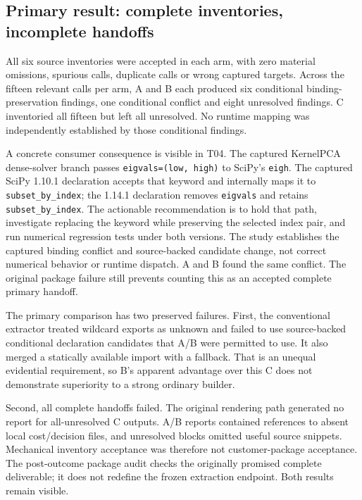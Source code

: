 \documentclass[11pt,a4paper]{article}
\begin{document}
\subsection{Primary result: complete inventories, incomplete handoffs}
All six source inventories were accepted in each arm, with zero material omissions, spurious calls, duplicate calls or wrong captured targets. Across the fifteen relevant calls per arm, A and B each produced six conditional binding-preservation findings, one conditional conflict and eight unresolved findings. C inventoried all fifteen but left all unresolved. No runtime mapping was independently established by those conditional findings.

A concrete consumer consequence is visible in T04. The captured KernelPCA dense-solver branch passes \texttt{eigvals=(low, high)} to SciPy's \texttt{eigh}. The captured SciPy 1.10.1 declaration accepts that keyword and internally maps it to \texttt{subset\_by\_index}; the 1.14.1 declaration removes \texttt{eigvals} and retains \texttt{subset\_by\_index}. The actionable recommendation is to hold that path, investigate replacing the keyword while preserving the selected index pair, and run numerical regression tests under both versions. The study establishes the captured binding conflict and source-backed candidate change, not correct numerical behavior or runtime dispatch. A and B found the same conflict. The original package failure still prevents counting this as an accepted complete primary handoff.

The primary comparison has two preserved failures. First, the conventional extractor treated wildcard exports as unknown and failed to use source-backed conditional declaration candidates that A/B were permitted to use. It also merged a statically available import with a fallback. That is an unequal evidential requirement, so B's apparent advantage over this C does not demonstrate superiority to a strong ordinary builder.

Second, all complete handoffs failed. The original rendering path generated no report for all-unresolved C outputs. A/B reports contained references to absent local cost/decision files, and unresolved blocks omitted useful source snippets. Mechanical inventory acceptance was therefore not customer-package acceptance. The post-outcome package audit checks the originally promised complete deliverable; it does not redefine the frozen extraction endpoint. Both results remain visible.
\end{document}
